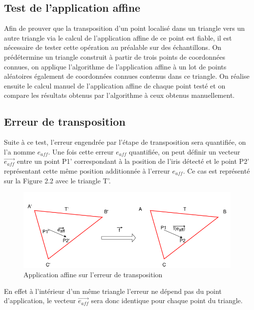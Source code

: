 \documentclass[a4paper, 12pt]{report}
\begin{document}
		\subsection{Test de l'application affine}
         Afin de prouver que la transposition d'un point localisé dans un triangle vers un autre triangle via le calcul de l'application affine de ce point est fiable, il est nécessaire de tester cette opération au préalable sur des échantillons. 
On prédétermine un triangle construit à partir de trois points de coordonnées connues, on applique l'algorithme de l'application affine à un lot de points aléatoires également de coordonnées connues contenus dans ce triangle. On réalise ensuite le calcul manuel de l'application affine de chaque point testé et on compare les résultats obtenus par l'algorithme à ceux obtenus manuellement.

		\subsection{Erreur de transposition}
        Suite à ce test, l'erreur engendrée par l'étape de transposition sera quantifiée, on l'a nomme $e_{aff}$.
        Une fois cette erreur $e_{aff}$ quantifiée, on peut définir un vecteur $\overrightarrow{e_{aff}}$ entre un point P1' correspondant à la position de l'iris détecté et le point P2' représentant cette même position additionnée à l'erreur $e_{aff}$. Ce cas est représenté sur la Figure 2.2 avec le triangle T'.
        \begin{figure}[!h]
	\includegraphics[scale=0.7]{erreur_affine.png}
	\caption{Application affine sur l'erreur de transposition}
	\end{figure}
	En effet à l'intérieur d'un même triangle l'erreur ne dépend pas du point d'application, le vecteur $\overrightarrow{e_{aff}}$ sera donc identique pour chaque point du triangle.
\end{document}
